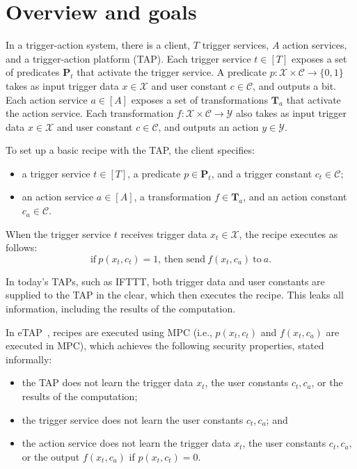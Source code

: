 \section{Overview and goals}
\label{sec:problem}


In a trigger-action system, there is a client, $T$ trigger services, $A$ action
services, and a trigger-action platform (TAP). Each trigger service $t \in [T]$
exposes a set of predicates $\mathbf{P}_t$ that activate the trigger service. A
predicate $p : \mathcal{X} \times \mathcal{C} \to \{0,1\}$ takes as input
trigger data $x \in \mathcal{X}$ and user constant $c \in \mathcal{C}$, and
outputs a bit. Each action service $a \in [A]$ exposes a set of transformations
$\mathbf{T}_a$ that activate the action service. Each transformation $f :
\mathcal{X} \times \mathcal{C} \to \mathcal{Y}$ also takes as input trigger data
$x \in \mathcal{X}$ and user constant $c \in \mathcal{C}$, and outputs an action
$y \in \mathcal{Y}$.

To set up a basic recipe with the TAP, the client specifies:
\begin{itemize}
  \item a trigger service $t \in [T]$, a predicate $p \in \mathbf{P}_t$, and a
    trigger constant $c_t \in \mathcal{C}$;
  \item an action service $a \in [A]$, a transformation $f \in \mathbf{T}_a$,
    and an action constant $c_a \in \mathcal{C}$.
\end{itemize}
When the trigger service $t$ receives trigger data $x_t \in \mathcal{X}$, the
recipe executes as follows:
\[
  \text{if}~p(x_t, c_t) = 1\text{, then send}~f(x_t, c_a)~\text{to}~a.
\]

In today's TAPs, such as IFTTT, both trigger data and user constants are
supplied to the TAP in the clear, which then executes the recipe. This leaks all
information, including the results of the computation.

In \textsf{eTAP}~\cite{DBLP:conf/sp/ChenCWSCF21}, recipes are executed using MPC
(i.e., $p(x_t, c_t)$ and $f(x_t, c_a)$ are executed in MPC), which achieves the
following security properties, stated informally:
\begin{itemize}
  \item the TAP does not learn the trigger data $x_t$, the user constants $c_t,
    c_a$, or the results of the computation;
  \item the trigger service does not learn the user constants $c_t, c_a$; and
  \item the action service does not learn the trigger data $x_t$, the user
    constants $c_t, c_a$, or the output $f(x_t, c_a)$ if $p(x_t, c_t) = 0$.
\end{itemize}

